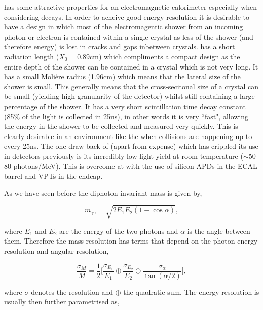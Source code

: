 \PbWO has some attractive properties for an electromagnetic calorimeter especially when considering \Hgg decays. In order to acheive good energy resolution it is desirable to have a design in which most of the electromagentic shower from an incoming photon or electron is contained within a single crystal as less of the shower (and therefore energy) is lost in cracks and gaps inbetween crystals. \PbWO has a short radiation length ($X_{0}=0.89$cm) which compliments a compact design as the entire depth of the shower can be contained in a crystal which is not very long. It has a small Moli\`{e}re radius (1.96cm) which means that the lateral size of the shower is small. This generally means that the cross-secitonal size of a crystal can be small (yielding high granularity of the detector) whilst still containing a large percentage of the shower. It has a very short scintillation time decay constant (85\% of the light is collected in 25ns), in other words it is very ``fast", allowing the energy in the shower to be collected and measured very quickly. This is clearly desirable in an environment like the \LHC when collisions are happening up to every 25ns. The one draw back of \PbWO (apart from expense) which has crippled its use in detectors previously is its incredibly low light yield at room temperature ($\sim$50-80 photons/MeV). This is overcome at \CMS with the use of silicon \acf{APDs} in the ECAL barrel and \acf{VPTs} in the endcap. 

As we have seen before the diphoton invariant mass is given by,

\begin{equation}
  m_{\gamma\gamma} = \sqrt{2E_{1}E_{2}(1-\cos\alpha)},
  \label{eq:dipho_inv_mass}
\end{equation}

where $E_{1}$ and $E_{2}$ are the energy of the two photons and $\alpha$ is the angle between them. Therefore the mass resolution has terms that depend on the photon energy resolution and angular resolution,

\begin{equation}
  \frac{\sigma_{M}}{M} = \frac{1}{2} \Biggl[ \frac{\sigma_{E_{1}}}{E_{1}} \oplus \frac{\sigma_{E_{2}}}{E_{2}} \oplus \frac{\sigma_{\alpha}}{\tan(\alpha/2)} \Biggr],
  \label{eq:mass_res}
\end{equation}

where $\sigma$ denotes the resolution and $\oplus$ the quadratic sum. The energy resolution is usually then further parametrised as,

